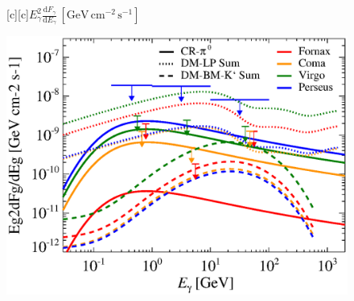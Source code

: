\documentclass[dvips]{article}
\begin{document}
\pagestyle{empty}

\newcommand{\size}{\Large}%

\begin{figure}
  [c][c]{\size $E_\gamma^2\frac{\mathrm{d}F_\gamma}{\mathrm{d}E_\gamma}\,[\mathrm{GeV}\,\mathrm{cm}^{-2}\,\mathrm{s}^{-1}]$}
  
    \includegraphics[width=\textwidth]{flux.cluster.comp.v8.0.1deg.1.6T.SubMass.SF300.IR2.noMW.woGal_raw.eps}
\end{figure}
\end{document}
